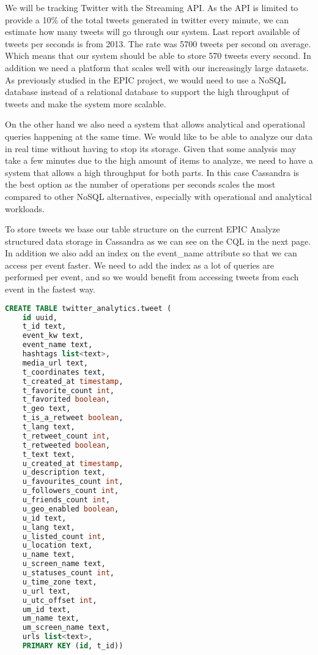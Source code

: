 We will be tracking Twitter with the Streaming API. As the API is limited to provide a 10\% of the total tweets generated in twitter every minute, we can estimate how many tweets will go through our system. Last report available of tweets per seconds is from 2013. The rate was 5700 tweets\parencite{tweetsRecord} per second on average.  Which means that our system should be able to store 570 tweets every second. In addition we need a platform that scales well with our increasingly large datasets. As previously studied in the EPIC project\parencite{mySQLnoSQL},  we would need to use a NoSQL database instead of a relational database to support the high throughput of tweets and make the system more scalable.

 
On the other hand we also need a system that allows analytical and operational queries happening at the same time. We would like to be able to analyze our data in real time without having to stop its storage. Given that some analysis may take a few minutes due to the high amount of items to analyze, we need to  have a system that allows a high throughput for both parts. In this case Cassandra is the best option as the number of operations per seconds scales the most compared to other NoSQL alternatives, especially with operational and analytical workloads\parencite{benchmarkNoSQL}.
 
To store tweets we base our table structure on the current EPIC Analyze structured data storage in Cassandra as we can see on the CQL in the next page. In addition we also add an index on the event\_name attribute so that we can access per event faster. We need to add the index as a lot of queries are performed per event, and so we would benefit from accessing tweets from each event in the fastest way.
\newpage
\begin{lstlisting}[language=SQL, caption=Tweets CQL table]
CREATE TABLE twitter_analytics.tweet (
    id uuid,
    t_id text,
    event_kw text,
    event_name text,
    hashtags list<text>,
    media_url text,
    t_coordinates text,
    t_created_at timestamp,
    t_favorite_count int,
    t_favorited boolean,
    t_geo text,
    t_is_a_retweet boolean,
    t_lang text,
    t_retweet_count int,
    t_retweeted boolean,
    t_text text,
    u_created_at timestamp,
    u_description text,
    u_favourites_count int,
    u_followers_count int,
    u_friends_count int,
    u_geo_enabled boolean,
    u_id text,
    u_lang text,
    u_listed_count int,
    u_location text,
    u_name text,
    u_screen_name text,
    u_statuses_count int,
    u_time_zone text,
    u_url text,
    u_utc_offset int,
    um_id text,
    um_name text,
    um_screen_name text,
    urls list<text>,
    PRIMARY KEY (id, t_id))
\end{lstlisting}

